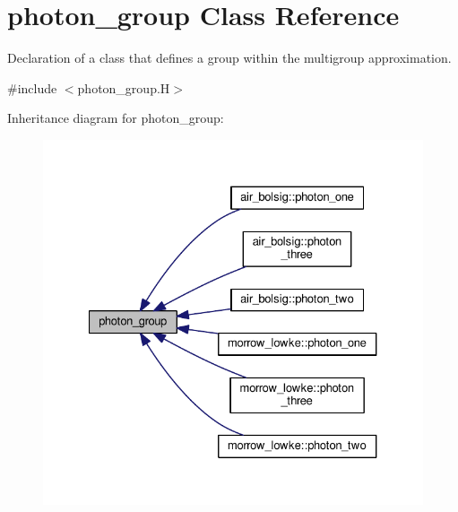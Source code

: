 \hypertarget{classphoton__group}{}\section{photon\+\_\+group Class Reference}
\label{classphoton__group}


Declaration of a class that defines a group within the multigroup approximation.  




{\ttfamily \#include $<$photon\+\_\+group.\+H$>$}



Inheritance diagram for photon\+\_\+group\+:\nopagebreak
\begin{figure}[H]
\begin{center}
\leavevmode
\includegraphics[width=327pt]{classphoton__group__inherit__graph}
\end{center}
\end{figure}
